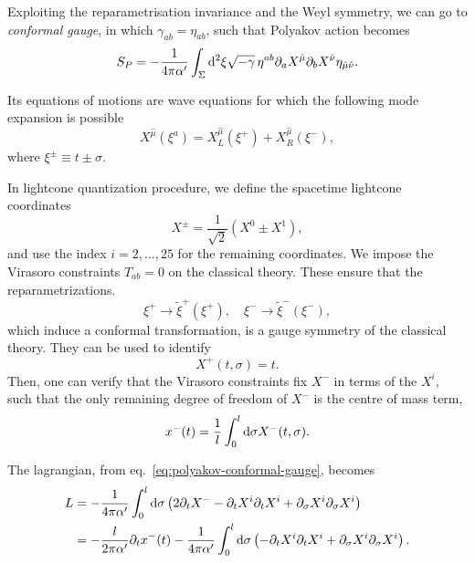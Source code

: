 Exploiting the reparametrisation invariance and the Weyl symmetry, we can go to \emph{conformal gauge}, in which $\gamma_{ab} = \eta_{ab}$, such that Polyakov action becomes
\begin{equation}\label{eq:polyakov-conformal-gauge}
    S_P= -\frac{1}{4\pi\alpha'} \int_\Sigma \mathop{}\!\mathrm{d}^2 \xi \sqrt{-\gamma} \, \eta^{ab} \partial_a X^{\hat{\mu}} \partial_b X^{\hat{\nu}} \eta_{\hat{\mu}\hat{\nu}} .
\end{equation}

Its equations of motions are wave equations for which the following mode expansion is possible
\begin{equation}\label{eq:left-right-movers-def}
    X^{\hat{\mu}}(\xi^a) = X^{\hat{\mu}}_L(\xi^+) + X^{\hat{\mu}}_R(\xi^-) ,
\end{equation}
where $\xi^\pm \equiv t \pm \sigma$.

In lightcone quantization procedure, we define the spacetime lightcone coordinates
\begin{equation}
    X^\pm = \frac{1}{\sqrt{2}}(X^0 \pm X^{1}),
\end{equation}
and use the index $i = 2, \dots, 25$ for the remaining coordinates. We impose the Virasoro constraints $T_{ab}=0$ on the classical theory. These ensure that the reparametrizations.
\begin{equation}
    \xi^+ \to \tilde{\xi}^+(\xi^+), \quad \xi^- \to \tilde{\xi}^-(\xi^-),
\end{equation}
which induce a conformal transformation, is a gauge symmetry of the classical theory. They can be used to identify
\begin{equation}
    X^+(t,\sigma) = t .
\end{equation}
Then, one can verify that the Virasoro constraints fix $X^-$ in terms of the $X^i$, such that the only remaining degree of freedom of $X^-$ is the centre of mass term,
\begin{equation}
    x^-(t) = \frac{1}{l} \int_0^l \mathop{}\!\mathrm{d} \sigma X^-(t,\sigma).
\end{equation}

The lagrangian, from eq.~\eqref{eq:polyakov-conformal-gauge}, becomes
\begin{equation}
\begin{split}
    L &= -\frac{1}{4\pi \alpha'} \int_0^l \mathop{}\!\mathrm{d} \sigma \left( 2 \partial_t X^- - \partial_t X^i \partial_t X^i + \partial_\sigma X^i \partial_\sigma X^i \right) \\ &= -\frac{l}{2\pi \alpha'} \partial_t x^-(t) - \frac{1}{4\pi \alpha'} \int_0^l \mathop{}\!\mathrm{d} \sigma \left( - \partial_t X^i \partial_t X^i + \partial_\sigma X^i \partial_\sigma X^i \right) .
\end{split}
\end{equation}

